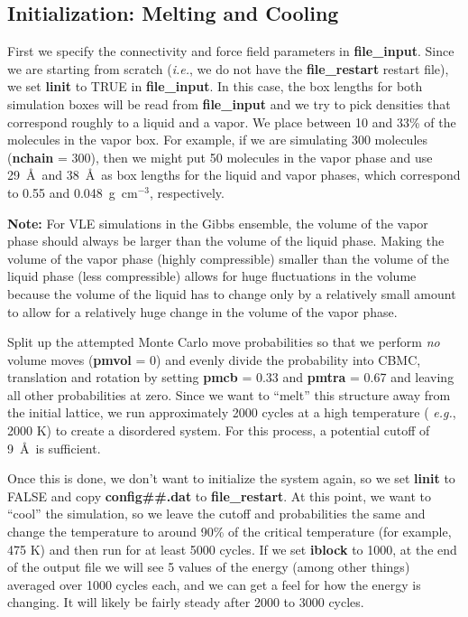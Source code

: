 \documentclass[12pt,letterpaper]{article}
\begin{document}
\subsection{Initialization: Melting and Cooling}
First we specify the connectivity and force field parameters
in {\bf file\_input}. Since we are starting from scratch
({\it i.e.}, we do not have the {\bf file\_restart} restart
file), we set {\bf linit} to TRUE in {\bf file\_input}. In
this case, the box lengths for both simulation boxes will be
read from {\bf file\_input} and we try to pick densities
that correspond roughly to a liquid and a vapor. We place
between 10 and 33\% of the molecules in the vapor box. For
example, if we are simulating 300 molecules ({\bf nchain} =
300), then we might put 50 molecules in the vapor phase and
use 29~\AA~and 38~\AA~as box lengths for the liquid and
vapor phases, which correspond to 0.55 and
0.048~g~cm$^{-3}$, respectively.

{\bf Note:} For VLE simulations in the Gibbs ensemble, the
volume of the vapor phase should always be larger than the
volume of the liquid phase. Making the volume of the vapor
phase (highly compressible) smaller than the volume of the
liquid phase (less compressible) allows for huge
fluctuations in the volume because the volume of the liquid
has to change only by a relatively small amount to allow for
a relatively huge change in the volume of the vapor phase.

Split up the attempted Monte Carlo move probabilities so
that we perform {\sl no} volume moves ({\bf pmvol} = 0) and
evenly divide the probability into CBMC, translation and
rotation by setting {\bf pmcb} = 0.33 and {\bf pmtra} = 0.67
and leaving all other probabilities at zero. Since we want
to ``melt'' this structure away from the initial lattice, we
run approximately 2000 cycles at a high temperature ({\it
  e.g.}, 2000 K) to create a disordered system. For this
process, a potential cutoff of 9~\AA~is sufficient.

\noindent Once this is done, we don't want to initialize the
system again, so we set {\bf linit} to FALSE and copy {\bf
  config\#\#.dat} to {\bf file\_restart}. At this point, we
want to ``cool'' the simulation, so we leave the cutoff and
probabilities the same and change the temperature to around
90\% of the critical temperature (for example, 475 K) and
then run for at least 5000 cycles. If we set {\bf iblock} to
1000, at the end of the output file we will see 5 values of
the energy (among other things) averaged over 1000 cycles
each, and we can get a feel for how the energy is changing.
It will likely be fairly steady after 2000 to 3000 cycles.
\end{document}
